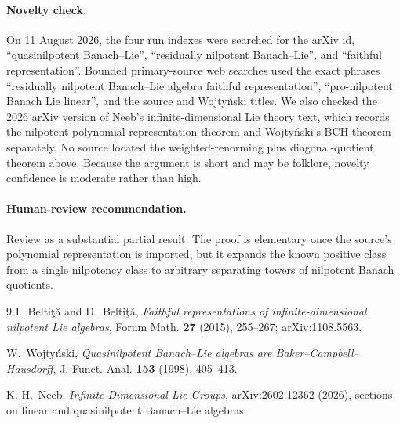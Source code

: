 \documentclass[11pt]{article}
\theoremstyle{definition}
\theoremstyle{remark}
\begin{document}
\paragraph{Novelty check.}
On 11 August 2026, the four run indexes were searched for the arXiv id,
``quasinilpotent Banach--Lie'', ``residually nilpotent Banach--Lie'', and
``faithful representation''. Bounded primary-source web searches used the
exact phrases ``residually nilpotent Banach--Lie algebra faithful
representation'', ``pro-nilpotent Banach Lie linear'', and the source and
Wojty\'nski titles. We also checked the 2026 arXiv version of Neeb's
infinite-dimensional Lie theory text, which records the nilpotent polynomial
representation theorem and Wojty\'nski's BCH theorem separately. No source
located the weighted-renorming plus diagonal-quotient theorem above. Because
the argument is short and may be folklore, novelty confidence is moderate
rather than high.

\paragraph{Human-review recommendation.}
Review as a substantial partial result. The proof is elementary once the
source's polynomial representation is imported, but it expands the known
positive class from a single nilpotency class to arbitrary separating towers
of nilpotent Banach quotients.

\begin{thebibliography}{9}
I.~Belti\c{t}\u{a} and D.~Belti\c{t}\u{a},
\emph{Faithful representations of infinite-dimensional nilpotent Lie
algebras}, Forum Math. \textbf{27} (2015), 255--267;
arXiv:1108.5563.

W.~Wojty\'nski,
\emph{Quasinilpotent Banach--Lie algebras are Baker--Campbell--Hausdorff},
J. Funct. Anal. \textbf{153} (1998), 405--413.

K.-H.~Neeb,
\emph{Infinite-Dimensional Lie Groups}, arXiv:2602.12362 (2026),
sections on linear and quasinilpotent Banach--Lie algebras.
\end{thebibliography}
\end{document}
